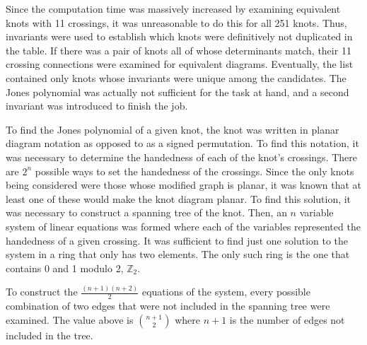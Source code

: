 \begin{paper}

Since the computation time was massively increased by examining equivalent knots
with 11 crossings, it was unreasonable to do this for all 251 knots.
Thus, invariants were used to establish which knots were definitively not
duplicated in the table.
If there was a pair of knots all of whose determinants match, their 11 crossing
connections were examined for equivalent diagrams.
Eventually, the list contained only knots whose invariants were unique among the
candidates.
The Jones polynomial was actually not sufficient for the task at hand, and a
second invariant was introduced to finish the job.


To find the Jones polynomial of a given knot, the knot was written in planar
diagram notation as opposed to as a signed permutation.
To find this notation, it was necessary to determine the handedness of each of
the knot's crossings.
There are $2^n$ possible ways to set the handedness of the crossings.
Since the only knots being considered were those whose modified graph is planar,
it was known that at least one of these would make the knot diagram planar.
To find this solution, it was necessary to construct a spanning tree of the
knot.
Then, an $n$ variable system of linear equations was formed where each of the
variables represented the handedness of a given crossing.
It was sufficient to find just one solution to the system in a ring that only
has two elements.
The only such ring is the one that contains 0 and 1 modulo 2, $\mathbb{Z}_2$.

To construct the $\frac{(n+1)(n+2)}2$ equations of the system, every possible
combination of two edges that were not included in the spanning tree were
examined.
The value above is ${n+1}\choose2$ where $n+1$ is the number of edges not
included in the tree.


\end{paper}
